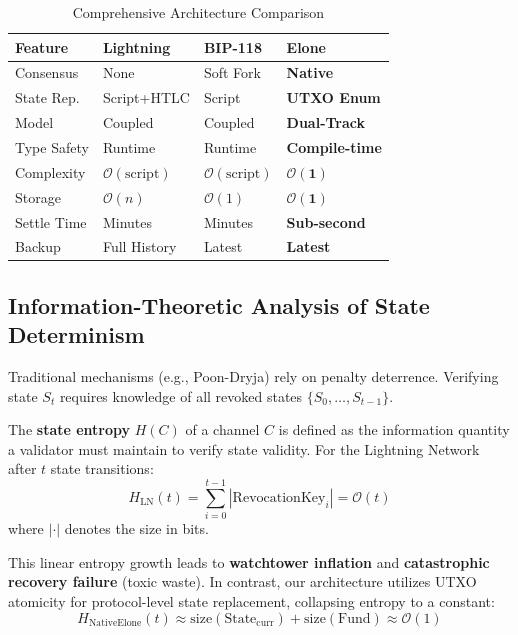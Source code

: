 \begin{table}[htbp]
\centering
\caption{Comprehensive Architecture Comparison}
\label{tab:arch-comparison}
\scriptsize
\begin{tabularx}{\linewidth}{@{}l X X X@{}}
\toprule
\textbf{Feature} & \textbf{Lightning} & \textbf{BIP-118} & \textbf{Elone} \\
\midrule
Consensus & None & Soft Fork & \textbf{Native} \\
State Rep. & Script+HTLC & Script & \textbf{UTXO Enum} \\
Model & Coupled & Coupled & \textbf{Dual-Track} \\
Type Safety & Runtime & Runtime & \textbf{Compile-time} \\
Complexity & $\mathcal{O}(\mathrm{script})$ & $\mathcal{O}(\mathrm{script})$ & $\mathbf{\mathcal{O}(1)}$ \\
Storage & $\mathcal{O}(n)$ & $\mathcal{O}(1)$ & $\mathbf{\mathcal{O}(1)}$ \\
Settle Time & Minutes & Minutes & \textbf{Sub-second} \\
Backup & Full History & Latest & \textbf{Latest} \\
\bottomrule
\end{tabularx}
\end{table}

\subsection{Information-Theoretic Analysis of State Determinism}

Traditional mechanisms (e.g., Poon-Dryja) rely on penalty deterrence. Verifying state $S_t$ requires knowledge of all revoked states $\{S_0, \dots, S_{t-1}\}$.

\begin{definition}
The \textbf{state entropy} $H(C)$ of a channel $C$ is defined as the information quantity a validator must maintain to verify state validity. For the Lightning Network after $t$ state transitions:
\begin{equation}
H_{\mathrm{LN}}(t) = \sum_{i=0}^{t-1} |\mathrm{RevocationKey}_i| = \mathcal{O}(t)
\end{equation}
where $|\cdot|$ denotes the size in bits.
\end{definition}

This linear entropy growth leads to \textbf{watchtower inflation} and \textbf{catastrophic recovery failure} (toxic waste). In contrast, our architecture utilizes UTXO atomicity for protocol-level state replacement, collapsing entropy to a constant:
\begin{equation}
H_{\mathrm{NativeElone}}(t) \approx \mathrm{size}(\mathrm{State}_{\mathrm{curr}}) + \mathrm{size}(\mathrm{Fund}) \approx \mathcal{O}(1)
\end{equation}

